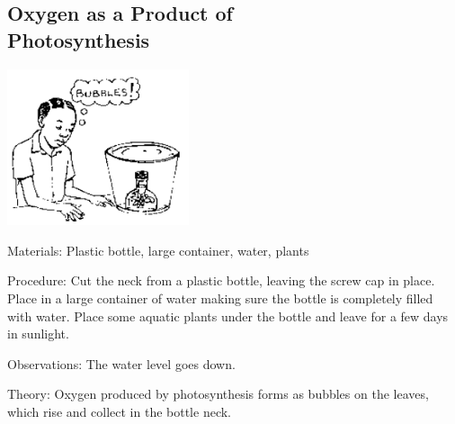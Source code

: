 \begin{multicols}{2}
\vfill
\columnbreak

\subsection[Oxygen as a Product of Photosynthesis]{Oxygen as a Product of \hfill \\ Photosynthesis} %

\begin{center}
\includegraphics[width=0.4\textwidth]{./img/source/photo-gas.png}
\end{center}

\begin{description*}
\item[Materials:]{Plastic bottle, large container, water, plants}
\item[Procedure:]{Cut the neck from a plastic bottle, leaving the screw cap in place. Place in a large
container of water making sure the bottle is completely filled with water. Place some aquatic
plants under the bottle and leave for a few days in sunlight.}
\item[Observations:]{The water level goes down. }
\item[Theory:]{Oxygen produced by photosynthesis forms as bubbles on the
leaves, which rise and collect in the bottle neck.}
\end{description*}


\end{multicols}
